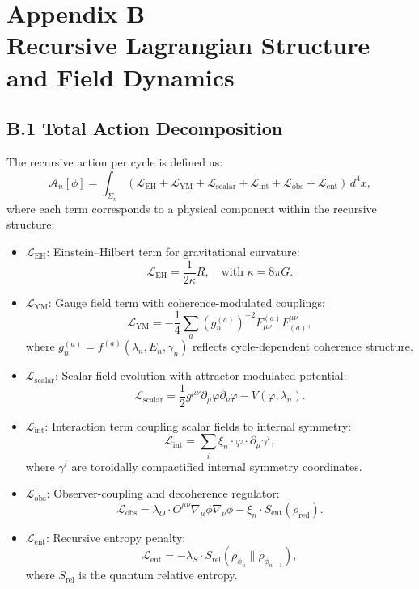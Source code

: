 \section*{Appendix B\\Recursive Lagrangian Structure and Field Dynamics}
\label{appendix:B}

\subsection*{B.1 Total Action Decomposition}

The recursive action per cycle is defined as:
\[
\mathcal{A}_n[\phi] = \int_{\Sigma_n} \left( 
\mathcal{L}_{\text{EH}} + 
\mathcal{L}_{\text{YM}} + 
\mathcal{L}_{\text{scalar}} + 
\mathcal{L}_{\text{int}} + 
\mathcal{L}_{\text{obs}} + 
\mathcal{L}_{\text{ent}} 
\right) \, d^4x,
\]
where each term corresponds to a physical component within the recursive structure:

\begin{itemize}[leftmargin=1.5em]
  \item $\mathcal{L}_{\text{EH}}$: Einstein–Hilbert term for gravitational curvature:
  \[
  \mathcal{L}_{\text{EH}} = \frac{1}{2\kappa} R,
  \quad \text{with } \kappa = 8\pi G.
  \]
  
  \item $\mathcal{L}_{\text{YM}}$: Gauge field term with coherence-modulated couplings:
  \[
  \mathcal{L}_{\text{YM}} = -\frac{1}{4} \sum_a \left( g_n^{(a)} \right)^{-2} F_{\mu\nu}^{(a)} F^{\mu\nu}_{(a)},
  \]
  where $g_n^{(a)} = f^{(a)}(\lambda_n, E_n, \gamma_n)$ reflects cycle-dependent coherence structure.

  \item $\mathcal{L}_{\text{scalar}}$: Scalar field evolution with attractor-modulated potential:
  \[
  \mathcal{L}_{\text{scalar}} = \frac{1}{2} g^{\mu\nu} \partial_\mu \varphi \partial_\nu \varphi - V(\varphi, \lambda_n).
  \]

  \item $\mathcal{L}_{\text{int}}$: Interaction term coupling scalar fields to internal symmetry:
  \[
  \mathcal{L}_{\text{int}} = \sum_i \xi_n \cdot \varphi \cdot \partial_\mu \gamma^i,
  \]
  where $\gamma^i$ are toroidally compactified internal symmetry coordinates.

  \item $\mathcal{L}_{\text{obs}}$: Observer-coupling and decoherence regulator:
  \[
  \mathcal{L}_{\text{obs}} = \lambda_O \cdot O^{\mu\nu} \nabla_\mu \phi \nabla_\nu \phi - \xi_n \cdot S_{\text{ent}}(\rho_{\text{red}}).
  \]

  \item $\mathcal{L}_{\text{ent}}$: Recursive entropy penalty:
  \[
  \mathcal{L}_{\text{ent}} = -\lambda_S \cdot S_{\text{rel}}(\rho_{\phi_n} \| \rho_{\phi_{n-1}}),
  \]
  where $S_{\text{rel}}$ is the quantum relative entropy.
\end{itemize}

